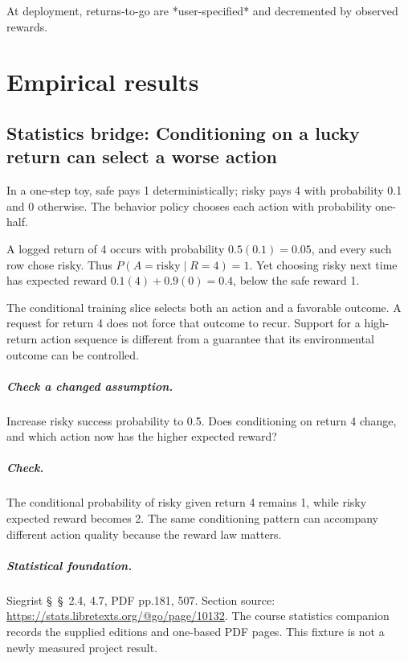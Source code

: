 \documentclass[11pt,oneside]{scrbook}
\begin{document}
At deployment, returns-to-go are *user-specified* and decremented by observed rewards.

\chapter{Empirical results}

\section{Statistics bridge: Conditioning on a lucky return can select a worse action}
\begin{example}
In a one-step toy, safe pays 1 deterministically; risky pays 4 with probability 0.1 and 0 otherwise. The behavior policy chooses each action with probability one-half.

A logged return of 4 occurs with probability $0.5(0.1)=0.05$, and every such row chose risky. Thus $P(A=\mathrm{risky}\mid R=4)=1$. Yet choosing risky next time has expected reward $0.1(4)+0.9(0)=0.4$, below the safe reward 1.
\end{example}
The conditional training slice selects both an action and a favorable outcome. A request for return 4 does not force that outcome to recur. Support for a high-return action sequence is different from a guarantee that its environmental outcome can be controlled.

\paragraph{Check a changed assumption.} Increase risky success probability to 0.5. Does conditioning on return 4 change, and which action now has the higher expected reward?
\paragraph{Check.} The conditional probability of risky given return 4 remains 1, while risky expected reward becomes 2. The same conditioning pattern can accompany different action quality because the reward law matters.
\paragraph{Statistical foundation.} Siegrist \S~\S~2.4, 4.7, PDF pp.181, 507. Section source: \url{https://stats.libretexts.org/@go/page/10132}. The course statistics companion records the supplied editions and one-based PDF pages. This fixture is not a newly measured project result.
\end{document}

